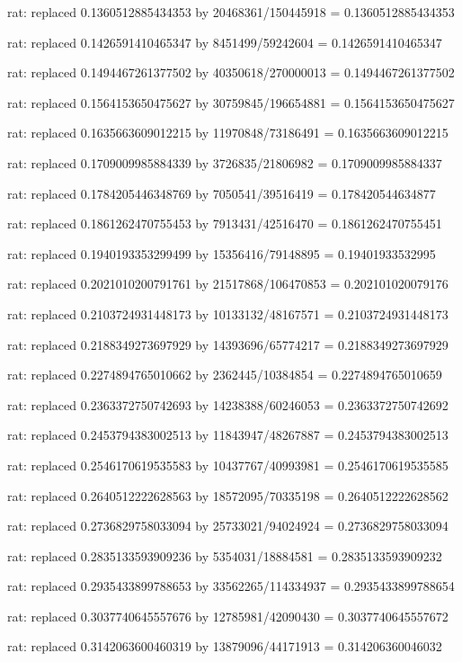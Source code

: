 \documentclass[a4paper,10pt]{article}
\begin{document}
\begin{eulernotebook}
\begin{eulercomment}
\begin{eulercomment}
\begin{eulercomment}
\begin{eulercomment}
\begin{eulercomment}
\begin{eulercomment}
\begin{eulercomment}
\begin{eulercomment}
\begin{eulercomment}
\begin{eulercomment}
\begin{eulercomment}
\begin{eulercomment}
\begin{eulercomment}
\begin{eulercomment}
\begin{eulercomment}
\begin{eulercomment}
\begin{euleroutput}
  rat: replaced 0.1360512885434353 by 20468361/150445918 = 0.1360512885434353
  
  rat: replaced 0.1426591410465347 by 8451499/59242604 = 0.1426591410465347
  
  rat: replaced 0.1494467261377502 by 40350618/270000013 = 0.1494467261377502
  
  rat: replaced 0.1564153650475627 by 30759845/196654881 = 0.1564153650475627
  
  rat: replaced 0.1635663609012215 by 11970848/73186491 = 0.1635663609012215
  
  rat: replaced 0.1709009985884339 by 3726835/21806982 = 0.1709009985884337
  
  rat: replaced 0.1784205446348769 by 7050541/39516419 = 0.178420544634877
  
  rat: replaced 0.1861262470755453 by 7913431/42516470 = 0.1861262470755451
  
  rat: replaced 0.1940193353299499 by 15356416/79148895 = 0.19401933532995
  
  rat: replaced 0.2021010200791761 by 21517868/106470853 = 0.202101020079176
  
  rat: replaced 0.2103724931448173 by 10133132/48167571 = 0.2103724931448173
  
  rat: replaced 0.2188349273697929 by 14393696/65774217 = 0.2188349273697929
  
  rat: replaced 0.2274894765010662 by 2362445/10384854 = 0.2274894765010659
  
  rat: replaced 0.2363372750742693 by 14238388/60246053 = 0.2363372750742692
  
  rat: replaced 0.2453794383002513 by 11843947/48267887 = 0.2453794383002513
  
  rat: replaced 0.2546170619535583 by 10437767/40993981 = 0.2546170619535585
  
  rat: replaced 0.2640512222628563 by 18572095/70335198 = 0.2640512222628562
  
  rat: replaced 0.2736829758033094 by 25733021/94024924 = 0.2736829758033094
  
  rat: replaced 0.2835133593909236 by 5354031/18884581 = 0.2835133593909232
  
  rat: replaced 0.2935433899788653 by 33562265/114334937 = 0.2935433899788654
  
  rat: replaced 0.3037740645557676 by 12785981/42090430 = 0.3037740645557672
  
  rat: replaced 0.3142063600460319 by 13879096/44171913 = 0.314206360046032
  

\end{euleroutput}
\end{eulercomment}
\end{eulercomment}
\end{eulercomment}
\end{eulercomment}
\end{eulercomment}
\end{eulercomment}
\end{eulercomment}
\end{eulercomment}
\end{eulercomment}
\end{eulercomment}
\end{eulercomment}
\end{eulercomment}
\end{eulercomment}
\end{eulercomment}
\end{eulercomment}
\end{eulercomment}
\end{eulernotebook}
\end{document}
